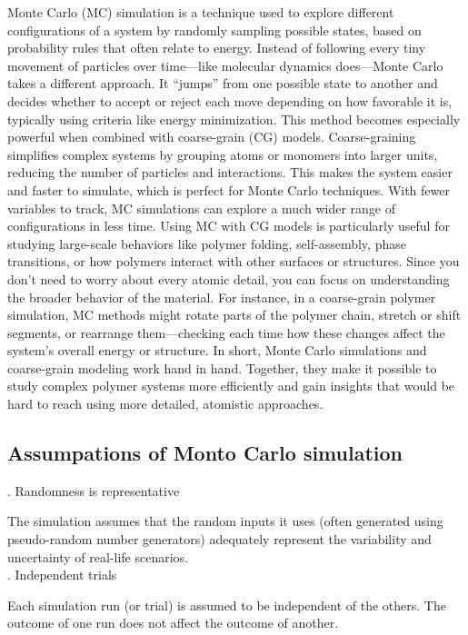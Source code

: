 \documentclass[12pt]{article}
\begin{document}
\begin{flushleft}
Monte Carlo (MC) simulation is a technique used to explore different configurations of a system by randomly sampling possible states, based on probability rules that often relate to energy. Instead of following every tiny movement of particles over time—like molecular dynamics does—Monte Carlo takes a different approach. It “jumps” from one possible state to another and decides whether to accept or reject each move depending on how favorable it is, typically using criteria like energy minimization.
This method becomes especially powerful when combined with coarse-grain (CG) models. Coarse-graining simplifies complex systems by grouping atoms or monomers into larger units, reducing the number of particles and interactions. This makes the system easier and faster to simulate, which is perfect for Monte Carlo techniques. With fewer variables to track, MC simulations can explore a much wider range of configurations in less time.
Using MC with CG models is particularly useful for studying large-scale behaviors like polymer folding, self-assembly, phase transitions, or how polymers interact with other surfaces or structures. Since you don’t need to worry about every atomic detail, you can focus on understanding the broader behavior of the material. For instance, in a coarse-grain polymer simulation, MC methods might rotate parts of the polymer chain, stretch or shift segments, or rearrange them—checking each time how these changes affect the system’s overall energy or structure.
In short, Monte Carlo simulations and coarse-grain modeling work hand in hand. Together, they make it possible to study complex polymer systems more efficiently and gain insights that would be hard to reach using more detailed, atomistic approaches.

\subsection*{Assumpations of Monto Carlo simulation}


. Randomness is representative
    
The simulation assumes that the random inputs it uses (often generated using pseudo-random number generators) adequately represent the variability and uncertainty of real-life scenarios.\\

. Independent trials
    
Each simulation run (or trial) is assumed to be independent of the others. The outcome of one run does not affect the outcome of another.


\end{flushleft}
\end{document}
